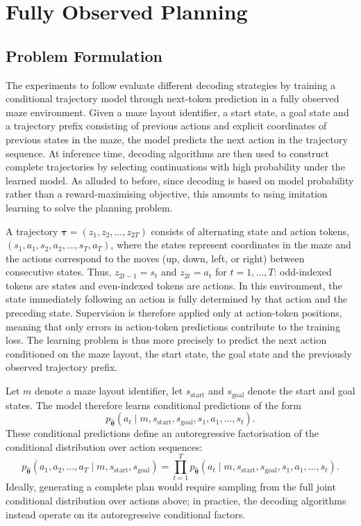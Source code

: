 ﻿\documentclass[12pt,a4paper]{article}
\theoremstyle{definition}
\begin{document}
\section{Fully Observed Planning}

\subsection{Problem Formulation}

The experiments to follow evaluate different decoding strategies
by training a conditional trajectory model through next-token prediction in a fully
observed maze environment.
Given a maze layout identifier, a start state, a goal state and a trajectory prefix consisting
of previous actions and explicit coordinates of previous states in the maze, the model 
predicts the next action in the trajectory sequence. At inference time, decoding algorithms are
then used to construct complete trajectories by selecting continuations with high probability 
under the learned model. As alluded to before, since decoding is based on model probability rather than a reward-maximising 
objective, this amounts to using imitation learning to solve the planning problem.

A trajectory $\boldsymbol{\tau} = (z_1, z_2, \dots, z_{2T})$ consists of alternating state and action 
tokens, \\ $(s_1, a_1, s_2, a_2, \dots, s_T, a_T)$, where the states represent coordinates in the maze and 
the actions correspond to the moves (up, down, left, or right) between consecutive states.
Thus, $z_{2t-1}=s_t$ and $z_{2t}=a_t$ for $t=1,\ldots,T$: odd-indexed tokens are states
and even-indexed tokens are actions. In this
environment, the state immediately following an action is fully determined by that action and the 
preceding state. Supervision is therefore applied only at action-token positions, meaning that only
errors in action-token predictions contribute to the training loss. The learning problem is thus
more precisely to predict the next action conditioned on the maze layout, the start state, the goal
state and the previously observed trajectory prefix. 

Let $m$ denote a maze layout identifier, let $s_{\mathrm{start}}$ and $s_{\mathrm{goal}}$ denote the start and goal states. 
The model therefore learns conditional predictions of the form
\begin{equation}
p_{\hat{\boldsymbol{\theta}}}(a_{t} \mid m, s_{\mathrm{start}}, s_{\mathrm{goal}}, s_1, a_1, \dots, s_t).
\end{equation}
These conditional predictions define an autoregressive factorisation of the 
conditional distribution over action sequences:
\begin{equation}
p_{\hat{\boldsymbol{\theta}}}(a_1, a_2, \dots, a_T \mid m, s_{\mathrm{start}}, s_{\mathrm{goal}})
=
\prod_{t=1}^{T}
p_{\hat{\boldsymbol{\theta}}}(a_t \mid m, s_{\mathrm{start}}, s_{\mathrm{goal}}, s_1, a_1, \dots, s_t).
\end{equation}
Ideally, generating a complete plan would require sampling from the full joint conditional
distribution over actions above; in practice, the decoding algorithms instead operate on
its autoregressive conditional factors.
\end{document}
